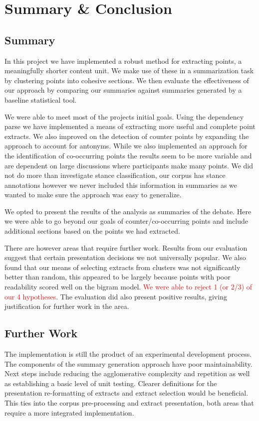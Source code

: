\chapter{Summary \& Conclusion \label{chap:conclusion}}
  \section{Summary}
    In this project we have implemented a robust method for extracting points, a meaningfully shorter content unit. We make use of these in a summarization task by clustering points into cohesive sections. We then evaluate the effectiveness of our approach by comparing our summaries against summaries generated by a baseline statistical tool.

    We were able to meet most of the projects initial goals. Using the dependency parse we have implemented a means of extracting more useful and complete point extracts. We also improved on the detection of counter points by expanding the approach to account for antonyms. While we also implemented an approach for the identification of co-occurring points the results seem to be more variable and are dependent on large discussions where participants make many points. We did not do more than investigate stance classification, our corpus has stance annotations however we never included this information in summaries as we wanted to make sure the approach was easy to generalize.

    We opted to present the results of the analysis as summaries of the debate. Here we were able to go beyond our goals of counter/co-occurring points and include additional sections based on the points we had extracted.

    There are however areas that require further work. Results from our evaluation suggest that certain presentation decisions we not universally popular. We also found that our means of selecting extracts from clusters was not significantly better than random, this appeared to be largely because points with poor readability scored well on the bigram model. \textcolor{red}{We were able to reject 1 (or 2/3) of our 4 hypotheses}. The evaluation did also present positive results, giving justification for further work in the area.

  \section{Further Work}
    The implementation is still the product of an experimental development process. The components of the summary generation approach have poor maintainability. Next steps include reducing the agglomerative complexity and repetition as well as establishing a basic level of unit testing. Clearer definitions for the presentation re-formatting of extracts and extract selection would be beneficial. This ties into the corpus pre-processing and extract presentation, both areas that require a more integrated implementation.

